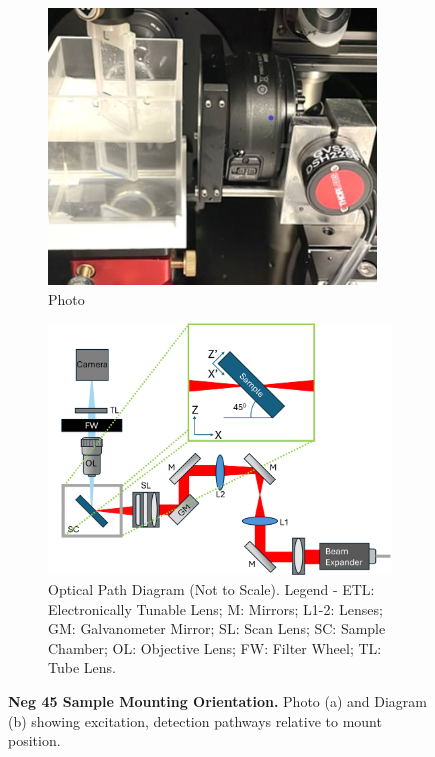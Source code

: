 \begin{figure}[H]
    \centering
    \begin{subfigure}[a]{0.85\textwidth}
    \centering
    \includegraphics[width=0.85\linewidth]{Figures/Screenshot (168).png}
    \caption{Photo}
    \end{subfigure}
    \medskip
   
    \begin{subfigure}[b]{0.85\textwidth}
    \centering
    \includegraphics[width=0.85\linewidth]{Figures/Figure2.12.png}
    \caption{Optical Path Diagram (Not to Scale). Legend - ETL: Electronically Tunable Lens; M: Mirrors; L1-2: Lenses; GM: Galvanometer Mirror; SL: Scan Lens; SC: Sample Chamber; OL: Objective Lens; FW: Filter Wheel; TL: Tube Lens.}
    \end{subfigure}
    
    \caption{\textbf{Neg 45 Sample Mounting Orientation.} Photo (a) and Diagram (b) showing excitation, detection pathways relative to mount position.}
    
\end{figure}

